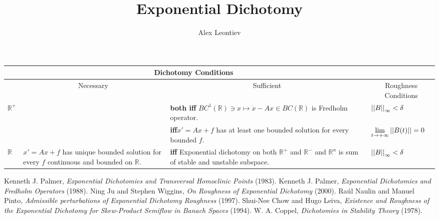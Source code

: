 \documentclass[12pt,fleqn]{article} %
\title{Exponential Dichotomy}
\author{Alex Leontiev}
\begin{document}
\maketitle
{}
\begin{center}
\newcommand{\mygraycenteredcell}[1]{\multicolumn{1}{c|}{\cellcolor{gray}#1}}
\newcommand{\mygraycenteredcello}{\cellcolor{gray}}

\begin{tabular}{ |l| p{} | p{} | p{}| }
\mygraycenteredcello&\multicolumn{2}{c|}{\cellcolor{gray}Dichotomy Conditions}&\mygraycenteredcello\\\hline
&\mygraycenteredcell{Necessary}&\mygraycenteredcell{Sufficient}&\mygraycenteredcell{Roughness Conditions}\\\hline\hline

$\mathbb{R}^+$&
&
\textbf{both iff} $BC^1(\mathbb{R})\ni x\mapsto \dot{x}-Ax\in BC(\mathbb{R})$ is Fredholm operator. \cite{palmer88}&
$\left|\left|B\right|\right|_\infty<\delta$ \cite{coppel}\\\hline

&
&
\textbf{iff}$x'=Ax+f$ has at least one bounded solution for every bounded $f$. \cite{coppel}&
$\lim_{t\to+\infty}\mynorm{B(t)}=0$\cite{coppel}\\\hline\hline

$\mathbb{R}$&
$x'=Ax+f$ has unique bounded solution for every $f$ continuous and bounded on $\mathbb{R}$.&
\textbf{iff} Exponential dichotomy on both $\mathbb{R}^+$ and $\mathbb{R}^-$ and $\mathbb{R}^n$ is sum of stable and unstable subspace.
	\cite[Proposition 2.1]{palmer84} &
$\left|\left|B\right|\right|_\infty<\delta$\cite{coppel}\\\hline
\end{tabular}
\end{center}
\begin{thebibliography}{9}
	Kenneth J. Palmer, {\em Exponential Dichotomies and Transversal Homoclinic Points} (1983).
	Kenneth J. Palmer, {\em Exponential Dichotomies and Fredholm Operators} (1988).
	Ning Ju and Stephen Wiggins, {\em On Roughness of Exponential Dichotomy} (2000).
	Ra\'ul Naulin and Manuel Pinto, {\em Admissible perturbations of Exponential Dichotomy Roughness} (1997).
	Shui-Nee Chow and Hugo Leiva, {\em Existence and Roughness of the Exponential Dichotomy for Skew-Product Semiflow in Banach Spaces} (1994).
	W. A. Coppel, {\em Dichotomies in Stability Theory} (1978).
\end{thebibliography}
\end{document}
